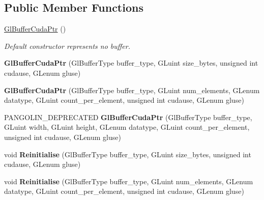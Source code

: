 \subsection*{Public Member Functions}
\begin{DoxyCompactItemize}
\item 
\hyperlink{structpangolin_1_1_gl_buffer_cuda_ptr_ac9b4a41fd4bfb92681aabe0220ae4c19}{Gl\+Buffer\+Cuda\+Ptr} ()\hypertarget{structpangolin_1_1_gl_buffer_cuda_ptr_ac9b4a41fd4bfb92681aabe0220ae4c19}{}\label{structpangolin_1_1_gl_buffer_cuda_ptr_ac9b4a41fd4bfb92681aabe0220ae4c19}

\begin{DoxyCompactList}\small\item\em Default constructor represents \textquotesingle{}no buffer\textquotesingle{}. \end{DoxyCompactList}\item 
{\bfseries Gl\+Buffer\+Cuda\+Ptr} (Gl\+Buffer\+Type buffer\+\_\+type, G\+Luint size\+\_\+bytes, unsigned int cudause, G\+Lenum gluse)\hypertarget{structpangolin_1_1_gl_buffer_cuda_ptr_a6a8eb4364a76bf152cf718db243d74b0}{}\label{structpangolin_1_1_gl_buffer_cuda_ptr_a6a8eb4364a76bf152cf718db243d74b0}

\item 
{\bfseries Gl\+Buffer\+Cuda\+Ptr} (Gl\+Buffer\+Type buffer\+\_\+type, G\+Luint num\+\_\+elements, G\+Lenum datatype, G\+Luint count\+\_\+per\+\_\+element, unsigned int cudause, G\+Lenum gluse)\hypertarget{structpangolin_1_1_gl_buffer_cuda_ptr_a43ea7966e05f24fa3ee1f4b108c66da0}{}\label{structpangolin_1_1_gl_buffer_cuda_ptr_a43ea7966e05f24fa3ee1f4b108c66da0}

\item 
P\+A\+N\+G\+O\+L\+I\+N\+\_\+\+D\+E\+P\+R\+E\+C\+A\+T\+ED {\bfseries Gl\+Buffer\+Cuda\+Ptr} (Gl\+Buffer\+Type buffer\+\_\+type, G\+Luint width, G\+Luint height, G\+Lenum datatype, G\+Luint count\+\_\+per\+\_\+element, unsigned int cudause, G\+Lenum gluse)\hypertarget{structpangolin_1_1_gl_buffer_cuda_ptr_a04776a32826133907613cf85956e6596}{}\label{structpangolin_1_1_gl_buffer_cuda_ptr_a04776a32826133907613cf85956e6596}

\item 
void {\bfseries Reinitialise} (Gl\+Buffer\+Type buffer\+\_\+type, G\+Luint size\+\_\+bytes, unsigned int cudause, G\+Lenum gluse)\hypertarget{structpangolin_1_1_gl_buffer_cuda_ptr_a8839c7255c48aff5f83144aca20369d0}{}\label{structpangolin_1_1_gl_buffer_cuda_ptr_a8839c7255c48aff5f83144aca20369d0}

\item 
void {\bfseries Reinitialise} (Gl\+Buffer\+Type buffer\+\_\+type, G\+Luint num\+\_\+elements, G\+Lenum datatype, G\+Luint count\+\_\+per\+\_\+element, unsigned int cudause, G\+Lenum gluse)\hypertarget{structpangolin_1_1_gl_buffer_cuda_ptr_a8bb960c4b57ba1b67a6556ff7a8dd645}{}\label{structpangolin_1_1_gl_buffer_cuda_ptr_a8bb960c4b57ba1b67a6556ff7a8dd645}

\end{DoxyCompactItemize}
